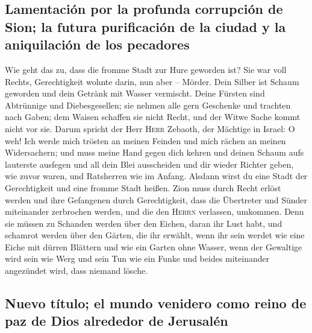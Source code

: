 \hypertarget{lamentaciuxf3n-por-la-profunda-corrupciuxf3n-de-sion-la-futura-purificaciuxf3n-de-la-ciudad-y-la-aniquilaciuxf3n-de-los-pecadores}{%
\subsection{Lamentación por la profunda corrupción de Sion; la futura
purificación de la ciudad y la aniquilación de los
pecadores}\label{lamentaciuxf3n-por-la-profunda-corrupciuxf3n-de-sion-la-futura-purificaciuxf3n-de-la-ciudad-y-la-aniquilaciuxf3n-de-los-pecadores}}

 Wie geht das zu, dass die fromme Stadt zur Hure geworden
ist? Sie war voll Rechts, Gerechtigkeit wohnte darin, nun aber --
Mörder.  Dein Silber ist Schaum geworden und dein Getränk
mit Wasser vermischt.  Deine Fürsten sind Abtrünnige und
Diebesgesellen; sie nehmen alle gern Geschenke und trachten nach Gaben;
dem Waisen schaffen sie nicht Recht, und der Witwe Sache kommt nicht vor
sie.  Darum spricht der Herr \textsc{Herr} Zebaoth, der
Mächtige in Israel: O weh! Ich werde mich trösten an meinen Feinden und
mich rächen an meinen Widersachern;  und muss meine Hand
gegen dich kehren und deinen Schaum aufs lauterste ausfegen und all dein
Blei ausscheiden  und dir wieder Richter geben, wie zuvor
waren, und Ratsherren wie im Anfang. Alsdann wirst du eine Stadt der
Gerechtigkeit und eine fromme Stadt heißen.  Zion muss
durch Recht erlöst werden und ihre Gefangenen durch Gerechtigkeit,
 dass die Übertreter und Sünder miteinander zerbrochen
werden, und die den \textsc{Herrn} verlassen, umkommen. 
Denn sie müssen zu Schanden werden über den Eichen, daran ihr Lust habt,
und schamrot werden über den Gärten, die ihr erwählt, 
wenn ihr sein werdet wie eine Eiche mit dürren Blättern und wie ein
Garten ohne Wasser,  wenn der Gewaltige wird sein wie
Werg und sein Tun wie ein Funke und beides miteinander angezündet wird,
dass niemand lösche.

\hypertarget{nuevo-tuxedtulo-el-mundo-venidero-como-reino-de-paz-de-dios-alrededor-de-jerusaluxe9n}{%
\subsection{Nuevo título; el mundo venidero como reino de paz de Dios
alrededor de
Jerusalén}\label{nuevo-tuxedtulo-el-mundo-venidero-como-reino-de-paz-de-dios-alrededor-de-jerusaluxe9n}}

